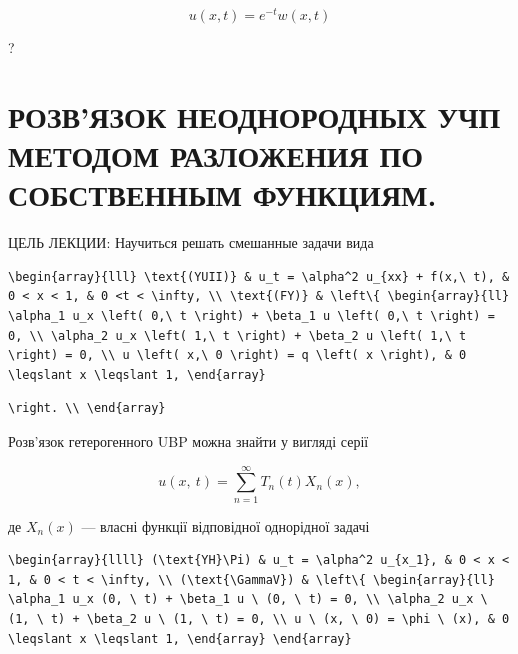 \documentclass[
  ukrainian,
]{article}
\begin{document}
\[
u(x, t) = e^{-t}w(x, t)
\]

?

\section{РОЗВ'ЯЗОК НЕОДНОРОДНЫХ УЧП МЕТОДОМ РАЗЛОЖЕНИЯ ПО СОБСТВЕННЫМ
ФУНКЦИЯМ.}\label{ux440ux43eux437ux432ux44fux437ux43eux43a-ux43dux435ux43eux434ux43dux43eux440ux43eux434ux43dux44bux445-ux443ux447ux43f-ux43cux435ux442ux43eux434ux43eux43c-ux440ux430ux437ux43bux43eux436ux435ux43dux438ux44f-ux43fux43e-ux441ux43eux431ux441ux442ux432ux435ux43dux43dux44bux43c-ux444ux443ux43dux43aux446ux438ux44fux43c.}

ЦЕЛЬ ЛЕКЦИИ: Научиться решать смешанные задачи вида

\begin{verbatim}
\begin{array}{lll} \text{(YUII)} & u_t = \alpha^2 u_{xx} + f(x,\ t), & 0 < x < 1, & 0 <t < \infty, \\ \text{(FY)} & \left\{ \begin{array}{ll} \alpha_1 u_x \left( 0,\ t \right) + \beta_1 u \left( 0,\ t \right) = 0, \\ \alpha_2 u_x \left( 1,\ t \right) + \beta_2 u \left( 1,\ t \right) = 0, \\ u \left( x,\ 0 \right) = q \left( x \right), & 0 \leqslant x \leqslant 1, \end{array}
\end{verbatim}

\begin{verbatim}
\right. \\ \end{array}
\end{verbatim}

Розв'язок гетерогенного UBP можна знайти у вигляді серії

\[
u\left( x,\ t\right) =\sum_{n=1}^{\infty}T_{n}\left( t\right) X_{n}\left( x\right) ,
\]

де \(X_n\left(x\right)\) --- власні функції відповідної однорідної
задачі

\begin{verbatim}
\begin{array}{llll} (\text{YH}\Pi) & u_t = \alpha^2 u_{x_1}, & 0 < x < 1, & 0 < t < \infty, \\ (\text{\GammaV}) & \left\{ \begin{array}{ll} \alpha_1 u_x (0, \ t) + \beta_1 u \ (0, \ t) = 0, \\ \alpha_2 u_x \ (1, \ t) + \beta_2 u \ (1, \ t) = 0, \\ u \ (x, \ 0) = \phi \ (x), & 0 \leqslant x \leqslant 1, \end{array} \end{array}
\end{verbatim}
\end{document}
